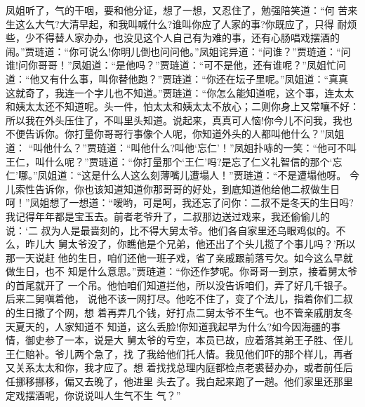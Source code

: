 凤姐听了，气的干咽，要和他分证，想了一想，又忍住了，勉强陪笑道：“何
苦来生这么大气?大清早起，和我叫喊什么?谁叫你应了人家的事?你既应了，只得
耐烦些，少不得替人家办办，也没见这个人自己有为难的事，还有心肠唱戏摆酒的
闹。”贾琏道：“你可说么!你明儿倒也问问他。”凤姐诧异道：“问谁？”贾琏道：“问
谁!问你哥哥！”凤姐道：“是他吗？”贾琏道：“可不是他，还有谁呢？”凤姐忙问
道：“他又有什么事，叫你替他跑？”贾琏道：“你还在坛子里呢。”凤姐道：“真真
这就奇了，我连一个字儿也不知道。”贾琏道：“你怎么能知道呢，这个事，连太太
和姨太太还不知道呢。头一件，怕太太和姨太太不放心；二则你身上又常嚷不好：
所以我在外头压住了，不叫里头知道。说起来，真真可人恼!你今儿不问我，我也
不便告诉你。你打量你哥哥行事像个人呢，你知道外头的人都叫他什么？”凤姐道：
“叫他什么？”贾琏道：“叫他什么?叫他‘忘仁’！”凤姐扑哧的一笑：“他可不叫
王仁，叫什么呢？”贾琏道：“你打量那个‘王仁’吗?是忘了仁义礼智信的那个‘忘
仁’哪。”凤姐道：“这是什么人这么刻薄嘴儿遭塌人！”贾琏道：“不是遭塌他呀。
今儿索性告诉你，你也该知道知道你那哥哥的好处，到底知道他给他二叔做生日
呵！”凤姐想了一想道：“嗳哟，可是呵，我还忘了问你：二叔不是冬天的生日吗?
我记得年年都是宝玉去。前者老爷升了，二叔那边送过戏来，我还偷偷儿的说：‘二
叔为人是最啬刻的，比不得大舅太爷。他们各自家里还乌眼鸡似的。不么，昨儿大
舅太爷没了，你瞧他是个兄弟，他还出了个头儿揽了个事儿吗？’所以那一天说赶
他的生日，咱们还他一班子戏，省了亲戚跟前落亏欠。如今这么早就做生日，也不
知是什么意思。”贾琏道：“你还作梦呢。你哥哥一到京，接着舅太爷的首尾就开了
一个吊。他怕咱们知道拦他，所以没告诉咱们，弄了好几千银子。后来二舅嗔着他，
说他不该一网打尽。他吃不住了，变了个法儿，指着你们二叔的生日撒了个网，想
着再弄几个钱，好打点二舅太爷不生气。也不管亲戚朋友冬天夏天的，人家知道不
知道，这么丢脸!你知道我起早为什么?如今因海疆的事情，御史参了一本，说是大
舅太爷的亏空，本员已故，应着落其弟王子胜、侄儿王仁赔补。爷儿两个急了，找
了我给他们托人情。我见他们吓的那个样儿，再者又关系太太和你，我才应了。想
着找找总理内庭都检点老裘替办办，或者前任后任挪移挪移，偏又去晚了，他进里
头去了。我白起来跑了一趟。他们家里还那里定戏摆酒呢，你说说叫人生气不生
气？”


